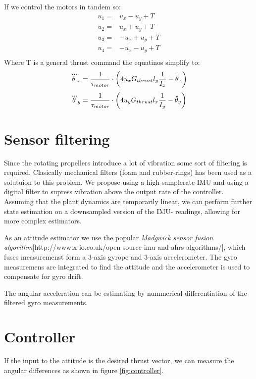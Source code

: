 If we control the motors in tandem so:
\begin{align}
u_1 = & u_x - u_y + T\\
u_2 = & u_x + u_y + T\\
u_3 = & -u_x + u_y + T\\
u_4 = & -u_x - u_y + T\\
\end{align}
Where T is a general thrust command the equatinos simplify to:
\begin{equation}
 \dddot\theta_x = \frac{1}{\tau_{motor}} \cdot \left(
 4 u_x G_{thrust} l_{y} \frac{ 1 }{ I_{x} }  - \ddot\theta_x
 \right) 
\end{equation}
\begin{equation}
 \dddot\theta_y = \frac{1}{\tau_{motor}} \cdot \left(
4 u_y G_{thrust} l_{x} \frac{ 1 }{ I_{y} }  - \ddot\theta_y
 \right) 
\end{equation}


\section{ Sensor filtering } %
Since the rotating propellers introduce a lot of vibration some sort of
filtering is required. Clasically mechanical filters (foam and rubber-rings) has
been used as a solutuion to this problem. We propose using a high-samplerate
IMU and using a digital filter to supress vibration above the output rate of the
controller. Assuming that the plant dynamics are temporarily linear, we can
perform further state estimation on a downsampled version of the IMU- readings,
allowing for more complex estimators.

As an attitude estimator we use the popular \emph{Madgwick sensor fusion
algorithm}[http://www.x-io.co.uk/open-source-imu-and-ahrs-algorithms/], which
fuses measuremenst form a 3-axis gyrope and 3-axis accelerometer. The gyro measuremens are integrated to find the attitude and the
accelerometer is used to compensate for gyro drift.

The angular acceleration can be estimating by nummerical differentiation of the
filtered gyro measurements.

\section{ Controller } %

If the input to the attitude is the desired thrust vector, we can measure the
angular differences as shown in figure \ref{fig:controller}.


